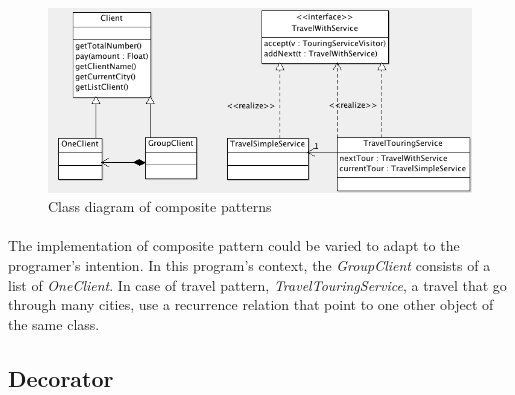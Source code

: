 \begin{figure}[h]
\centering
\includegraphics[width=12cm]{project/images/composite.png}
\caption{Class diagram of composite patterns}
\end{figure}

\paragraph{}
The implementation of composite pattern could be varied to adapt to the programer's intention. In this program's context, the \textit{GroupClient} consists of a list of \textit{OneClient}. In case of travel pattern, \textit{TravelTouringService}, a travel that go through many cities, use a recurrence relation that point to one other object of the same class.

\newpage
\subsection{Decorator}